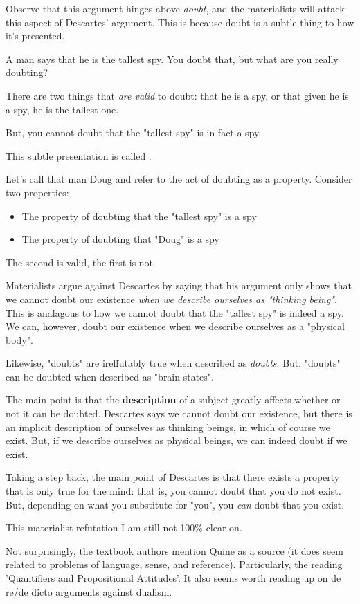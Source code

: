 Observe that this argument hinges above \textit{doubt}, and the materialists will attack this aspect of Descartes' argument. This is because doubt is a subtle thing to how it's presented.

\begin{example}
    A man says that he is the tallest spy. You doubt that, but what are you really doubting?

    There are two things that \textit{are valid} to doubt: that he is a spy, or that given he is a spy, he is the tallest one.

    But, you cannot doubt that the "tallest spy" is in fact a spy.

    This subtle presentation is called .
\end{example}

Let's call that man Doug and refer to the act of doubting as a property. Consider two properties:
\begin{itemize}
    \item The property of doubting that the "tallest spy" is a spy
    \item The property of doubting that "Doug" is a spy
\end{itemize}

The second is valid, the first is not. 

Materialists argue against Descartes by saying that his argument only shows that we cannot doubt our existence \textit{when we describe ourselves as "thinking being"}. This is analagous to how we cannot doubt that the "tallest spy" is indeed a spy. We can, however, doubt our existence when we describe ourselves as a "physical body". 

Likewise, "doubts" are ireffutably true when described as \textit{doubts}. But, "doubts" can be doubted when described as "brain states".

The main point is that the \textbf{description} of a subject greatly affects whether or not it can be doubted. Descartes says we cannot doubt our existence, but there is an implicit description of ourselves as thinking beings, in which of course we exist. But, if we describe ourselves as physical beings, we can indeed doubt if we exist.

Taking a step back, the main point of Descartes is that there exists a property that is only true for the mind: that is, you cannot doubt that you do not exist. But, depending on what you substitute for "you", you \textit{can} doubt that you exist.

\begin{remark}
   This materialist refutation I am still not 100\% clear on.

   Not surprisingly, the textbook authors mention Quine as a source (it does seem related to problems of language, sense, and reference). Particularly, the reading 'Quantifiers and Propositional Attitudes'. It also seems worth reading up on de re/de dicto arguments against dualism.
\end{remark}

